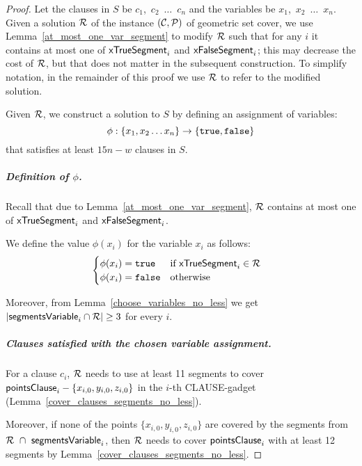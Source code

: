 \begin{proof}\leavevmode
Let the clauses in $S$ be $c_1$,~$c_2$~$\ldots$~$c_n$
and the variables be $x_1$,~$x_2$~$\ldots$~$x_n$.
Given a solution $\mathcal{R}$
of the instance $(\mathcal{C}, \mathcal{P})$ of geometric set cover, we use Lemma~\ref{at_most_one_var_segment} to modify $\mathcal{R}$ such that for any $i$ it contains at most one of $\mathsf{xTrueSegment}_{i}$ and $\mathsf{xFalseSegment}_{i}$; this may decrease the cost of $\mathcal{R}$, but that does not matter in the subsequent construction. To simplify notation, in the remainder of this proof we use $\mathcal{R}$ to refer to the modified solution.

Given $\mathcal{R}$, we construct a solution to $S$ by defining an
assignment of variables:
$$\phi : \{ x_1, x_2 \ldots x_n\} \rightarrow \{\texttt{true}, \texttt{false}\}$$
that satisfies at least $15n-w$ clauses in $S$.

\subparagraph{Definition of $\phi$.}
Recall that due to Lemma~\ref{at_most_one_var_segment},
$\mathcal{R}$ contains at most one of $\mathsf{xTrueSegment}_{i}$ and $\mathsf{xFalseSegment}_{i}$.

We define the value $\phi(x_i)$ for the variable $x_i$ as follows:
\begin{align}
	\begin{split}
	\label{eqn:variable_assignment}
	& \begin{cases}
	\phi(x_i) = \texttt{true} & \text{if}\ \mathsf{xTrueSegment}_{i} \in \mathcal{R} \\
	\phi(x_i) = \texttt{false} & \text{otherwise}
	\end{cases}
	\end{split}
\end{align}

Moreover, from Lemma~\ref{choose_variables_no_less} we get $|\mathsf{segmentsVariable}_{i} \cap \mathcal{R}| \ge 3$ for every $i$.

\subparagraph{Clauses satisfied with the chosen variable assignment.}

For a clause $c_i$,
$\mathcal{R}$ needs to use at least 11 segments to cover $\mathsf{pointsClause}_{i} - \{x_{i,0}, y_{i,0}, z_{i,0}\}$
in the $i$-th CLAUSE-gadget (Lemma~\ref{cover_clauses_segments_no_less}).

Moreover, if none of the points $\{x_{i,0}, y_{i,0}, z_{i,0}\}$
are covered by the segments from $\mathcal{R}~\cap~\mathsf{segmentsVariable}_{i}$,
then $\mathcal{R}$ needs to cover $\mathsf{pointsClause}_{i}$
with at least 12 segments
by Lemma~\ref{cover_clauses_segments_no_less}.

\iffalse
\begin{align}
	\begin{split}
	\label{eqn:clauses}
	|\sol \cap \segmentsClause_i| \ge
	\begin{cases}
	11 & \text{if any of points } \{x_{i,0}, y_{i,0}, z_{i,0}\} \text{ is covered by segments from } \sol~\cap~\pointsVar{i} \\
	12 & \text{otherwise} \\
	\end{cases} \\
	\end{split}
\end{align}
\fi


\end{proof}
